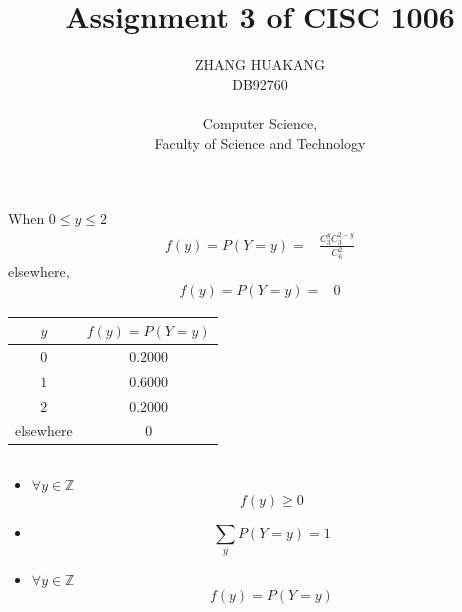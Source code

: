 \documentclass{article}
\title{Assignment 3 of CISC 1006}
\author{ZHANG HUAKANG \\ DB92760 \\ \\ Computer Science, \\Faculty of Science and Technology}
\begin{document}
    \maketitle
    \section{}
        \subsection{}
            When $0\leq y\leq 2$
            \begin{equation*}
                \begin{split}
                    f(y)=P(Y=y)=&\frac{C_3^yC_3^{2-y}}{C_6^2}
                \end{split}
            \end{equation*}
            elsewhere,
            \begin{equation*}
                \begin{split}
                    f(y)=P(Y=y)=&0
                \end{split}
            \end{equation*}
            \begin{center}
                \begin{tabular}{c| c}
                    $y$ &$f(y)=P(Y=y)$    \\
                    \hline
                    $0$&$0.2000$\\
                    $1$&$0.6000$\\
                    $2$&$0.2000$\\
                    elsewhere&$0$\\                
                \end{tabular}
            \end{center}
        \subsection{}
            \begin{itemize}
                \item $\forall y\in \mathbb{Z}$$$f(y)\geq 0$$
                \item $$\sum_{y}P(Y=y)=1$$
                \item $\forall y\in \mathbb{Z}$ $$f(y)=P(Y=y)$$
            \end{itemize}
    \section{}
\end{document}
